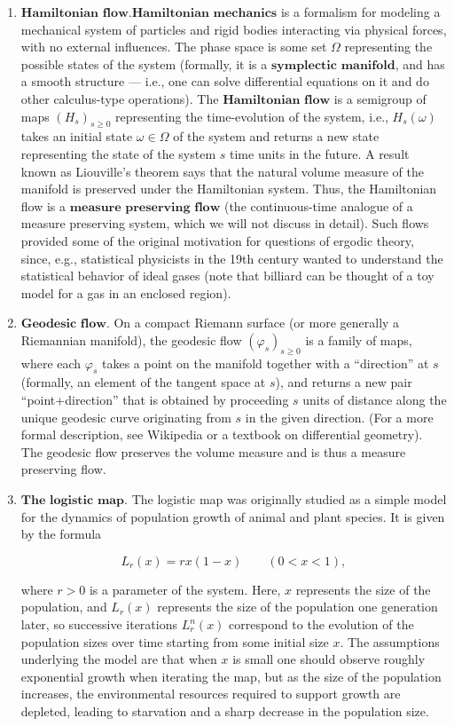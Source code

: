 \documentclass[11pt]{report}
\theoremstyle{plain}
\theoremstyle{definition}
\begin{document}
\begin{enumerate}[label=\arabic*.]
\item $\textbf{Hamiltonian flow.}$$\textbf{Hamiltonian mechanics}$ is a formalism for
modeling a mechanical system of particles and rigid
bodies interacting via physical forces, with no
external influences. The phase space is some set
$\Omega$ representing the possible states of the
system (formally, it is a
$\textbf{symplectic manifold}$, and has a smooth
structure --- i.e.,  one can solve differential
equations on it and do other calculus-type
operations). The $\textbf{Hamiltonian flow}$ is a
semigroup of maps $(H_s)_{s\ge 0}$ representing the
time-evolution of the system, i.e., $H_s(\omega)$
takes an initial state $\omega\in\Omega$ of the
system and returns a new state representing the state
of the system $s$ time units in the future. A result
known as Liouville's theorem says that the natural
volume measure of the manifold is preserved under the
Hamiltonian system. Thus, the Hamiltonian flow is a
$\textbf{measure preserving flow}$ (the
continuous-time analogue of a measure preserving
system, which we will not discuss in detail). Such
flows provided some of the original motivation for
questions of ergodic theory, since, e.g., statistical
physicists in the 19th century wanted to understand
the statistical behavior of ideal gases (note that
billiard can be thought of a toy model for a gas in an
enclosed region).

\item $\textbf{Geodesic flow.}$ On a compact Riemann
surface (or more generally a Riemannian manifold), the
geodesic flow $(\varphi_s)_{s\ge0}$ is a family of
maps, where each $\varphi_s$ takes a point on the
manifold together with a ``direction'' at $s$
(formally, an element of the tangent space at $s$),
and returns a new pair ``point+direction'' that is
obtained by proceeding $s$ units of distance along
the unique geodesic curve originating from $s$ in the
given direction. (For a more formal description, see
Wikipedia or a textbook on differential geometry). The
geodesic flow preserves the volume measure and is thus
a measure preserving flow.

\item $\textbf{The logistic map.}$ The logistic map was
originally studied as a simple model for the dynamics
of population growth of animal and plant species. It
is given by the formula

\[
L_r(x) = rx(1-x) \qquad (0<x<1),
\]

\noindent where $r>0$ is a parameter of the system. Here, $x$
represents the size of the population, and $L_r(x)$
represents the size of the population one generation
later, so successive iterations $L_r^{n}(x)$
correspond to the evolution of the population sizes
over time starting from some initial size $x$. The
assumptions underlying the model are that when $x$ is
small one should observe roughly exponential growth
when iterating the map, but as the size of the
population increases, the environmental resources
required to support growth are depleted, leading to
starvation and a sharp decrease in the population
size.


\end{enumerate}
\end{document}
